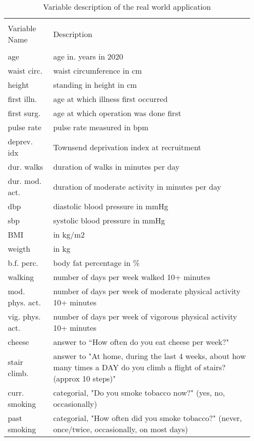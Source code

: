     \begin{longtable}[c]{lp{8cm}}
    \caption{Variable description of the real world application \label{tab:var_descr}}\\    %
    \\[-1.8ex]\hline 
    \hline \\[-1.8ex] 
    Variable Name 	&	Description	\\ 
    \hline \\[-1.8ex] 
        age	&	age in. years in 2020	\\
        waist circ.	&	waist circumference in cm	\\
        height	&	standing in height in cm 	\\
        first illn.	&	age at which illness first occurred 	\\
        first surg. 	&	age at which operation was done first	\\
        pulse rate	&	pulse rate measured in bpm 	\\
        deprev. idx	&	Townsend deprivation index at recruitment	\\
        dur. walks	&	duration of walks in minutes per day	\\
        dur. mod. act. 	&	duration of moderate activity in minutes per day	\\
        dbp	&	diastolic blood pressure in mmHg	\\
        sbp	&	systolic blood pressure in mmHg	\\
        BMI	&	in kg/m2	\\
        weigth	&	in kg	\\
        b.f. perc.	&	body fat percentage in \%	\\
        walking	&	number of days per week walked 10+ minutes 	\\
        mod. phys. act.	&	number of days per week of moderate physical activity  10+ minutes 	\\
        vig. phys. act.	&	number of days per week of vigorous physical activity 10+ minutes 	\\
        cheese	&	answer to ``How often do you eat cheese per week?" 	\\
        stair climb.	&	answer to "At home, during the last 4 weeks, about how many times a DAY do you climb a flight of stairs? (approx 10 steps)" 	\\
        curr. smoking	&	categorial, "Do you smoke tobacco now?" (yes, no, occasionally)	\\
        past smoking	&	categorial, "How often did you smoke tobacco?" (never, once/twice, occasionally, on most days)	\\

\end{longtable}
